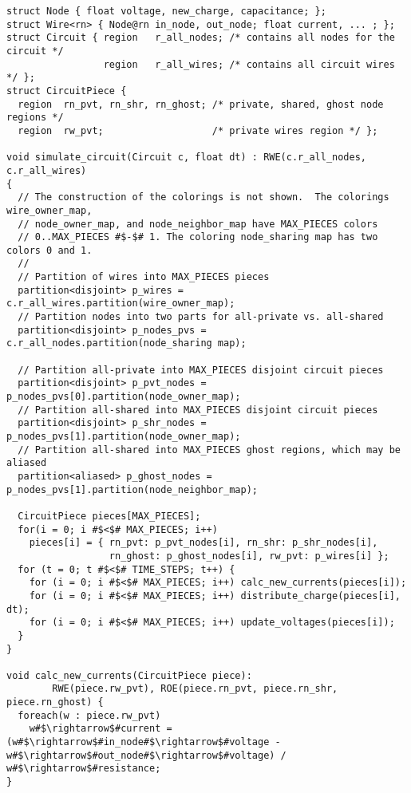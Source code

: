 \begin{lstlisting}[float={t},label={lst:code_ex},caption={Circuit simulation.}]
struct Node { float voltage, new_charge, capacitance; };
struct Wire<rn> { Node@rn in_node, out_node; float current, ... ; };
struct Circuit { region   r_all_nodes; /* contains all nodes for the circuit */
                 region   r_all_wires; /* contains all circuit wires */ };
struct CircuitPiece {
  region  rn_pvt, rn_shr, rn_ghost; /* private, shared, ghost node regions */
  region  rw_pvt;                   /* private wires region */ };

void simulate_circuit(Circuit c, float dt) : RWE(c.r_all_nodes, c.r_all_wires)
{
  // The construction of the colorings is not shown.  The colorings wire_owner_map,
  // node_owner_map, and node_neighbor_map have MAX_PIECES colors 
  // 0..MAX_PIECES #$-$# 1. The coloring node_sharing map has two colors 0 and 1.
  //
  // Partition of wires into MAX_PIECES pieces
  partition<disjoint> p_wires = c.r_all_wires.partition(wire_owner_map); 
  // Partition nodes into two parts for all-private vs. all-shared
  partition<disjoint> p_nodes_pvs = c.r_all_nodes.partition(node_sharing map);

  // Partition all-private into MAX_PIECES disjoint circuit pieces
  partition<disjoint> p_pvt_nodes = p_nodes_pvs[0].partition(node_owner_map);
  // Partition all-shared into MAX_PIECES disjoint circuit pieces
  partition<disjoint> p_shr_nodes = p_nodes_pvs[1].partition(node_owner_map);
  // Partition all-shared into MAX_PIECES ghost regions, which may be aliased
  partition<aliased> p_ghost_nodes = p_nodes_pvs[1].partition(node_neighbor_map);

  CircuitPiece pieces[MAX_PIECES];
  for(i = 0; i #$<$# MAX_PIECES; i++) 
    pieces[i] = { rn_pvt: p_pvt_nodes[i], rn_shr: p_shr_nodes[i],
                  rn_ghost: p_ghost_nodes[i], rw_pvt: p_wires[i] };
  for (t = 0; t #$<$# TIME_STEPS; t++) {
    for (i = 0; i #$<$# MAX_PIECES; i++) calc_new_currents(pieces[i]);
    for (i = 0; i #$<$# MAX_PIECES; i++) distribute_charge(pieces[i], dt);
    for (i = 0; i #$<$# MAX_PIECES; i++) update_voltages(pieces[i]);
  }
}

void calc_new_currents(CircuitPiece piece):
        RWE(piece.rw_pvt), ROE(piece.rn_pvt, piece.rn_shr, piece.rn_ghost) {
  foreach(w : piece.rw_pvt)
    w#$\rightarrow$#current = (w#$\rightarrow$#in_node#$\rightarrow$#voltage - w#$\rightarrow$#out_node#$\rightarrow$#voltage) / w#$\rightarrow$#resistance;
}


\end{lstlisting}
